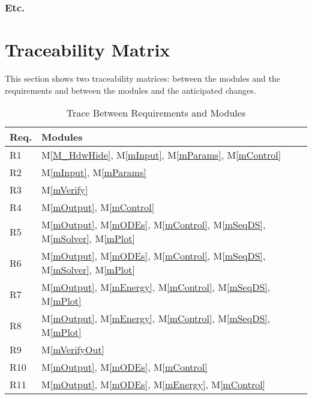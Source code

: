\documentclass[12pt, titlepage]{article}
\newcommand{\mref}[1]{M\ref{#1}}
\begin{document}
\subsubsection{Etc.}

\section{Traceability Matrix} \label{SecTM}

This section shows two traceability matrices: between the modules and the
requirements and between the modules and the anticipated changes.

\begin{table}[H]
\centering
\begin{tabular}{p{} p{}}
\toprule
\textbf{Req.} & \textbf{Modules}\\
\midrule
R1 & \mref{M_HdwHide}, \mref{mInput}, \mref{mParams}, \mref{mControl}\\
R2 & \mref{mInput}, \mref{mParams}\\
R3 & \mref{mVerify}\\
R4 & \mref{mOutput}, \mref{mControl}\\
R5 & \mref{mOutput}, \mref{mODEs}, \mref{mControl}, \mref{mSeqDS}, \mref{mSolver}, \mref{mPlot}\\
R6 & \mref{mOutput}, \mref{mODEs}, \mref{mControl}, \mref{mSeqDS}, \mref{mSolver}, \mref{mPlot}\\
R7 & \mref{mOutput}, \mref{mEnergy}, \mref{mControl}, \mref{mSeqDS}, \mref{mPlot}\\
R8 & \mref{mOutput}, \mref{mEnergy}, \mref{mControl}, \mref{mSeqDS}, \mref{mPlot}\\
R9 & \mref{mVerifyOut}\\
R10 & \mref{mOutput}, \mref{mODEs}, \mref{mControl}\\
R11 & \mref{mOutput}, \mref{mODEs}, \mref{mEnergy}, \mref{mControl}\\
\bottomrule
\end{tabular}
\caption{Trace Between Requirements and Modules}
\label{TblRT}
\end{table}
\end{document}
